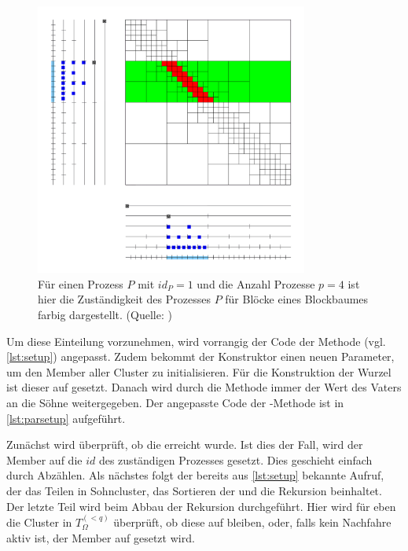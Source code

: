     \begin{figure}[t]
      \includegraphics[width=0.8\textwidth]{img/verteilter_blockbaum.png}
      \caption{Für einen Prozess $P$ mit $id_P = 1$ und die Anzahl Prozesse $p = 4$ ist hier die Zuständigkeit des Prozesses $P$ für Blöcke eines Blockbaumes farbig dargestellt.
	       (Quelle: \citet{h2slides})}
      \label{fig:vertblock}
    \end{figure}
    
    Um diese Einteilung vorzunehmen, wird vorrangig der Code der Methode  (vgl. \autoref{lst:setup}) angepasst. 
    Zudem bekommt der Konstruktor  einen neuen Parameter, um den Member  aller Cluster zu initialisieren. Für die Konstruktion der Wurzel ist dieser auf
     gesetzt. Danach wird durch die Methode  immer der Wert des Vaters an die Söhne weitergegeben.
    Der angepasste Code der -Methode ist in \autoref{lst:parsetup} aufgeführt.
    
    Zunächst wird überprüft, ob die  erreicht wurde. Ist dies der Fall, wird der Member  auf 
    die $id$ des zuständigen Prozesses gesetzt. Dies geschieht einfach durch Abzählen. Als nächstes folgt der bereits aus \autoref{lst:setup} bekannte Aufruf, der das Teilen in Sohncluster, das 
    Sortieren der  und die Rekursion beinhaltet. Der letzte Teil wird beim Abbau der Rekursion durchgeführt. Hier wird für eben die Cluster in $T_\Omega^{(<q)}$ überprüft, ob diese 
    auf  bleiben, oder, falls kein Nachfahre aktiv ist, der Member  auf  gesetzt wird.
    
